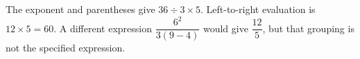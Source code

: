 The exponent and parentheses give $36\div3\times5$. Left-to-right evaluation is $12\times5=\boxed{60}$. A different expression $\dfrac{6^2}{3(9-4)}$ would give $\dfrac{12}{5}$, but that grouping is not the specified expression.
